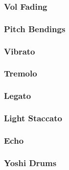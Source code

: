 \subsubsection{Vol Fading}
\subsubsection{Pitch Bendings}
\subsubsection{Vibrato}
\subsubsection{Tremolo}
\subsubsection{Legato}
\subsubsection{Light Staccato}
\subsubsection{Echo}
\subsubsection{Yoshi Drums}